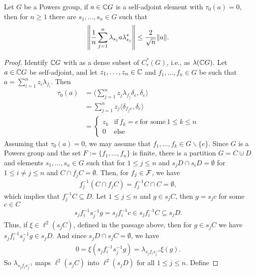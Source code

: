 \begin{proposition}\label{power group estimate}
Let $G$ be a Powers group, if $a \in \mathbb{C} G$ is a self-adjoint element with $\tau_0(a)=0$, then for $n \geq 1$ there are $s_1,\dots,s_n \in G$ such that
\begin{align*}
\left\lVert \frac{1}{n} \sum_{j=1}^n \lambda_{s_j} a \lambda_{s_j}^*\right\rVert \leq \frac{2}{\sqrt{n}} \lVert a \rVert.
\end{align*}
\begin{proof}
Identify $\mathbb{C} G$ with as a dense subset of $C_r^*(G)$, i.e., as $\lambda(\mathbb{C} G)$. Let $a \in \mathbb{C} G$ be self-adjoint, and let $z_1,\dots, z_n \in \mathbb{C}$ and $f_1, \dots ,f_n \in G$ be such that $a=\sum_{i=1}^n z_i \lambda_{f_i}$. Then 
\begin{align*}
\tau_0(a)&=\langle \sum_{j=1}^n z_j \lambda_{f_{j}} \delta_e,\delta_e\rangle\\
&=\sum_{j=1}^n z_j \langle \delta_{f_{j} e}, \delta_{e}\rangle\\
&=\begin{cases}
z_k & \text{if} \ f_k = e \ \text{for some} \ 1 \leq k \leq n\\
0 & \text{else}
\end{cases}
\end{align*}
Assuming that $\tau_0(a)=0$, we may assume that $f_1, \dots, f_k \in G \backslash \{e\}$. Since $G$ is a Powers group and the set $F:=\{f_1,\dots,f_n\}$ is finite, there is a partition $G=C \cupdot D$ and elements $s_1,\dots,s_n \in G$ such that for $1 \leq j \leq n$ and $s_j D \cap s_i D = \emptyset$ for $1 \leq i \neq j \leq n$ and $C \cap f_jC=\emptyset$. Then, for $f_j \in \mathcal{F}$, we have
\begin{align*}
f_j^{-1}(C \cap f_jC)=f_j^{-1}C \cap C=\emptyset,
\end{align*}
which implies that $f_j^{-1}C \subseteq D$. Let $1 \leq j \leq n$ and $g \in s_j C$, then $g=s_jc$ for some $c \in C$ 
\begin{align*}
s_j f_i^{-1} s_j^{-1}g=s_j f_i^{-1} c \in s_j f_i^{-1} C \subseteq s_jD. 
\end{align*}
Thus, if $\xi \in \ell^2(s_j C)$, defined in the passage above, then for $g \in s_jC$ we have $s_j f_i^{-1} s_j^{-1}g \in s_jD$. And since $s_jD \cap s_j C = \emptyset$, we have
\begin{align*}
0=\xi(s_j f_i^{-1} s_j^{-1}g)=\lambda_{s_j f_i s_j^{-1}}\xi(g).
\end{align*}
So $\lambda_{s_j f_i s_j^{-1}}$ maps $\ell^2(s_j C)$ into $\ell^2(s_j D)$ for all $1 \leq j \leq n$. Define

\end{proof}
\end{proposition}
